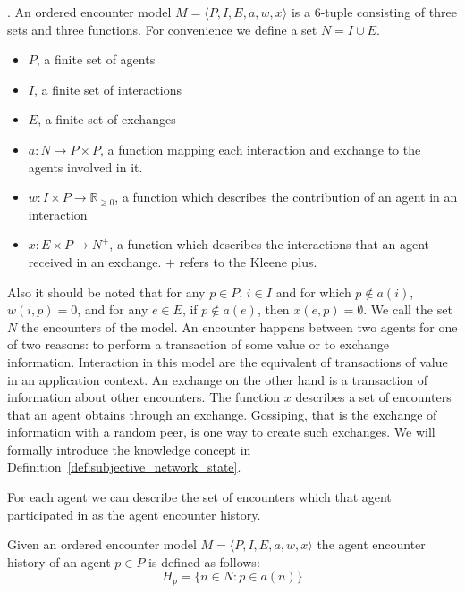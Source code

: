 \begin{defn}. 
    \label{def:base}
    An ordered encounter model $M = \langle P, I, E, a, w, x \rangle$ is a 6-tuple consisting
     of three sets and three functions. For convenience we define a set $N = I \cup E$. 
    \begin{itemize}
        \item $P$, a finite set of agents
        \item $I$, a finite set of interactions
        \item $E$, a finite set of exchanges
        \item $a : N \rightarrow P \times P$, a function mapping each interaction and exchange to the agents 
        involved in it.
        \item $w : I \times P \rightarrow \mathbb{R}_{\geq0}$, a function which describes the 
        contribution of an agent in an interaction
        \item $x : E \times P \rightarrow N^+$, a function which describes the interactions that an 
        agent received in an exchange. $+$ refers to the Kleene plus.
    \end{itemize}
\end{defn}

Also it should be noted that for any $p \in P$, $i \in I$ and for which $p \notin a(i)$, $w(i,p) = 0$, 
and for any $e \in E$, if $p \notin a(e)$, then $x(e, p) = \emptyset$.
We call the set $N$ the encounters of the model. An encounter happens between two agents for one of
two reasons: to perform a transaction of some value or to exchange information.
Interaction in this model are the equivalent of transactions of value in an application context. 
An exchange on the other hand is a transaction of information about other encounters.
The function $x$ describes a set of encounters that an agent obtains through an 
exchange. Gossiping, that is the exchange of information with a random peer, is one way to create 
such exchanges. We will formally introduce the 
knowledge concept in Definition~\ref{def:subjective_network_state}.

For each agent we can describe the set of encounters which that agent participated in as the agent 
encounter history. 

\begin{defn}
    Given an ordered encounter model $M = \langle P, I, E, a, w, x \rangle$ the agent encounter history of an agent $p \in P$ is defined as follows:
    \begin{equation}
        H_p = \{ n \in N : p \in a(n) \}
    \end{equation}
\end{defn}


